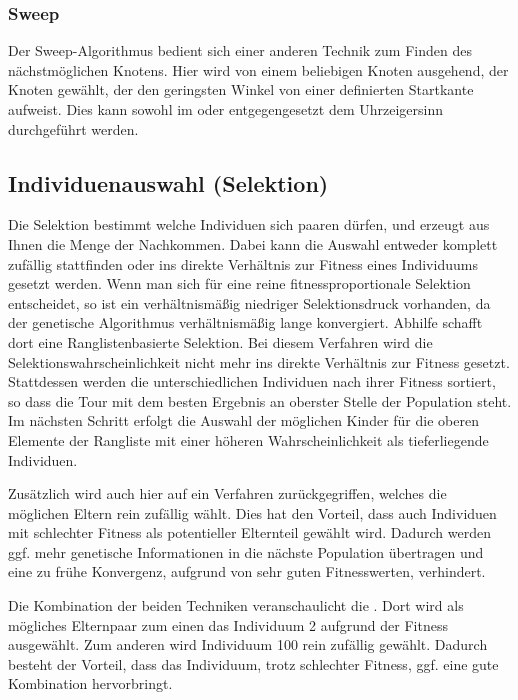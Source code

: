 \subsubsection{Sweep}
Der Sweep-Algorithmus bedient sich einer anderen Technik zum Finden des nächstmöglichen Knotens. Hier wird von einem beliebigen Knoten ausgehend, der Knoten gewählt, der den geringsten Winkel von einer definierten Startkante aufweist. Dies kann sowohl im oder entgegengesetzt dem Uhrzeigersinn durchgeführt werden.

\subsection{Individuenauswahl (Selektion)}
\label{sec:GenetischerSelektion}
Die Selektion bestimmt welche Individuen sich paaren dürfen, und erzeugt aus Ihnen die Menge der Nachkommen. Dabei kann die Auswahl entweder komplett zufällig stattfinden oder ins direkte Verhältnis zur Fitness eines Individuums gesetzt werden. Wenn man sich für eine reine fitnessproportionale Selektion entscheidet, so ist ein verhältnismäßig niedriger Selektionsdruck vorhanden, da der genetische Algorithmus verhältnismäßig lange konvergiert. Abhilfe schafft dort eine Ranglistenbasierte Selektion. Bei diesem Verfahren wird die Selektionswahrscheinlichkeit nicht mehr ins direkte Verhältnis zur Fitness gesetzt. Stattdessen werden die unterschiedlichen Individuen nach ihrer Fitness sortiert, so dass die Tour mit dem besten Ergebnis an oberster Stelle der Population steht. Im nächsten Schritt erfolgt die Auswahl der möglichen Kinder für die oberen Elemente der Rangliste mit einer höheren Wahrscheinlichkeit als tieferliegende Individuen. 

Zusätzlich wird auch hier auf ein Verfahren zurückgegriffen, welches die möglichen Eltern rein zufällig wählt. Dies hat den Vorteil, dass auch Individuen mit schlechter Fitness als potentieller Elternteil gewählt wird. Dadurch werden ggf. mehr genetische Informationen in die nächste Population übertragen und eine zu frühe Konvergenz, aufgrund von sehr guten Fitnesswerten, verhindert. 

Die Kombination der beiden Techniken veranschaulicht die . Dort wird als mögliches Elternpaar zum einen das Individuum 2 aufgrund der Fitness ausgewählt. Zum anderen wird Individuum 100 rein zufällig gewählt. Dadurch besteht der Vorteil, dass das Individuum, trotz schlechter Fitness, ggf. eine gute Kombination hervorbringt.


